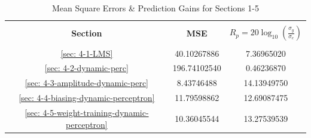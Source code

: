 \documentclass[12pt]{article}
\begin{document}
		\begin{table}[H]
			\centering
			\begin{tabular}{|c|c||c|}
				\hline
				&&\\[-1em]
				\textbf{Section} & \textbf{MSE} & \textbf{$R_p = 20\log_{10}({\frac{\sigma_y}{\sigma_e}})$} \\
				&&\\[-1em]
				\hline
				\hline
				\ref{sec: 4-1-LMS}	&	40.10267886		&	7.36965020 \\
				\hline
				\ref{sec: 4-2-dynamic-perc}	&	196.74102540	&	0.46236870 \\
				\hline
				\ref{sec: 4-3-amplitude-dynamic-perc}	&	8.43746488		&	14.13949750 \\
				\hline
				\ref{sec: 4-4-biasing-dynamic-perceptron}	&	11.79598862		&	12.69087475 \\
				\hline
				\ref{sec: 4-5-weight-training-dynamic-perceptron}	&	10.36045544		&	13.27539539 \\
				\hline
			\end{tabular}
			\captionsetup{justification=centering}
			\caption{Mean Square Errors \& Prediction Gains for Sections 1-5}
			\label{tab: 4-mse-Rp}
		\end{table}
	
\end{document}
